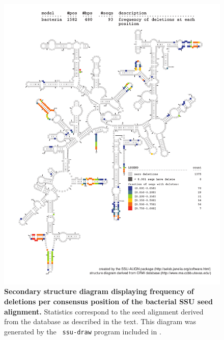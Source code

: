 \begin{figure}
\begin{center}
\includegraphics[width=5.7in]{Figures/bacteria-0p1-dall}
\end{center}
\caption[Secondary structure diagram displaying frequency of deletions
  per consensus position of the bacterial SSU seed
  alignment]{\textbf{Secondary structure diagram displaying frequency 
  of deletions per consensus position of the bacterial SSU seed
  alignment.} Statistics correspond to the  seed
  alignment derived from the  database \cite{CannoneGutell02}
  as described in the text. This diagram was generated by the {\tt
  ssu-draw} program included in .}
\label{fig:bacdel}
\end{figure}


